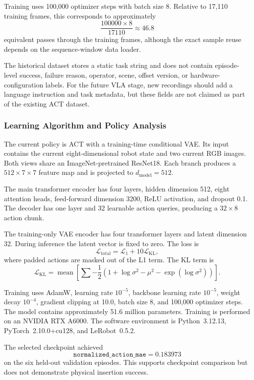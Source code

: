 \documentclass[12pt, letterpaper]{article}
\begin{document}
Training uses 100,000 optimizer steps with batch size 8. Relative to 17,110 training frames, this corresponds to approximately
\[
\frac{100000\times8}{17110}\approx46.8
\]
equivalent passes through the training frames, although the exact sample reuse depends on the sequence-window data loader.

The historical dataset stores a static task string and does not contain episode-level success, failure reason, operator, scene, offset version, or hardware-configuration labels. For the future VLA stage, new recordings should add a language instruction and task metadata, but these fields are not claimed as part of the existing ACT dataset.

\subsubsection{Learning Algorithm and Policy Analysis}

The current policy is ACT with a training-time conditional VAE. Its input contains the current eight-dimensional robot state and two current RGB images. Both views share an ImageNet-pretrained ResNet18. Each branch produces a \(512\times7\times7\) feature map and is projected to \(d_{\mathrm{model}}=512\).

The main transformer encoder has four layers, hidden dimension 512, eight attention heads, feed-forward dimension 3200, ReLU activation, and dropout 0.1. The decoder has one layer and 32 learnable action queries, producing a \(32\times8\) action chunk.

The training-only VAE encoder has four transformer layers and latent dimension 32. During inference the latent vector is fixed to zero. The loss is
\[
\mathcal L_{\mathrm{total}}
=
\mathcal L_{1}
+
10\mathcal L_{\mathrm{KL}},
\]
where padded actions are masked out of the L1 term. The KL term is
\[
\mathcal L_{\mathrm{KL}}
=
\operatorname{mean}
\left[
\sum
-\frac{1}{2}
\left(
1+\log\sigma^2-\mu^2-\exp(\log\sigma^2)
\right)
\right].
\]

Training uses AdamW, learning rate \(10^{-5}\), backbone learning rate \(10^{-5}\), weight decay \(10^{-4}\), gradient clipping at 10.0, batch size 8, and 100,000 optimizer steps. The model contains approximately 51.6 million parameters. Training is performed on an NVIDIA RTX A6000. The software environment is Python~3.12.13, PyTorch~2.10.0+cu128, and LeRobot~0.5.2.

The selected checkpoint achieved
\[
\texttt{normalized\_action\_mae}=0.183973
\]
on the six held-out validation episodes. This supports checkpoint comparison but does not demonstrate physical insertion success.
\end{document}
